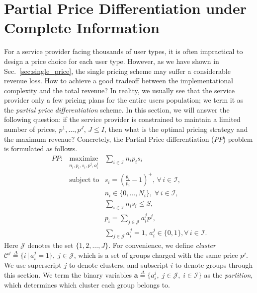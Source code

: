 \documentclass[twocolumn,10pt,twosided]{IEEEtran}
\begin{document}
\section{Partial Price Differentiation under Complete Information}
\label{sec:PPD}
For a service provider facing thousands of user types, it is often impractical to design a price choice for each user type. 
However, as we have shown in Sec.~\ref{sec:single_price}, the single pricing scheme may suffer a considerable revenue loss.  How to achieve a good  tradeoff  between the implementational complexity and the total revenue?
In reality, we usually see that the service provider  only a few pricing plans for the entire users population; we term it as the \emph{partial price differentiation} scheme. In this section, we will answer the following question: if the service provider is constrained to maintain a limited number of prices, $p^1,\dots,p^J$, $J\le I$, then what is the optimal pricing strategy and the maximum revenue?
Concretely, the Partial Price differentiation ($PP$) problem is formulated as follows.
\begin{eqnarray}
   PP: &\underset{n_i,p_i,s_i,p^j,a_i^{j}}{ {\text{maximize}}} & \sum\limits_{i\in\mathcal{I}}  n_i p_i s_i \nonumber\\
&\text{subject to} & s_i =\left(\frac{\theta_i }{p_i } - 1\right)^+,\, \forall\, i\in \mathcal{I}, \label{eq:ppd_ic}\\
    && n_i \in\{0,\ldots,N_{i}\}, \; \forall\, i\in \mathcal{I}, \label{eq:ad}\\
    && \sum\limits_{i\in\mathcal{I}} n_i s_i \le S, \label{eq:resource}\\
    && p_i=\sum\limits_{j\in\mathcal{J}}a_{i}^{j}p^j, \label{eq:ppd_price}\\
    && \sum_{j\in\mathcal{J}}\!\!a_{i}^{j}=1,\, a_i^j\in\{0,1\}, \forall\, i\in \mathcal{I}. \label{eq:ppd_price_2}
\end{eqnarray}
Here $\mathcal{J}$ denotes the set $\{1,2,\dots,J\}$.   For convenience, we define \emph{cluster}  $\mathcal{C}^j\overset{\Delta}{=}\{i\,|\,a_i^j=1\},\; j\in \mathcal{J}$,  which is a set of groups charged with the same price $p^j$.  We use superscript $j$ to denote clusters, and subscript $i$ to denote groups through this section. We term the binary variables $\boldsymbol{a}\overset{\Delta}{=}\{a_i^j,\;j\in\mathcal{J},\; i\in\mathcal{I}\}$ as the \emph{partition}, which determines which cluster each group belongs to.
\end{document}
